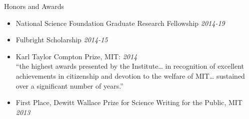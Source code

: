 \documentclass{resume} %
\begin{document}
\begin{rSection}{Honors and Awards}

\begin{itemize}
\item
National Science Foundation Graduate Research Fellowship \hfill {\em 2014-19}
\item
Fulbright Scholarship \hfill {\em 2014-15}
\item
  Karl Taylor Compton Prize, MIT: \hfill {\em 2014} \\
``the highest awards presented by the Institute\ldots
in recognition of excellent achievements in citizenship 
and devotion to the welfare of MIT\ldots
sustained over a significant number of years.'' 
\item
First Place, Dewitt Wallace Prize for Science Writing for the Public, 
MIT \hfill {\em 2013} 
\end{itemize}

\end{rSection}

\end{document}
